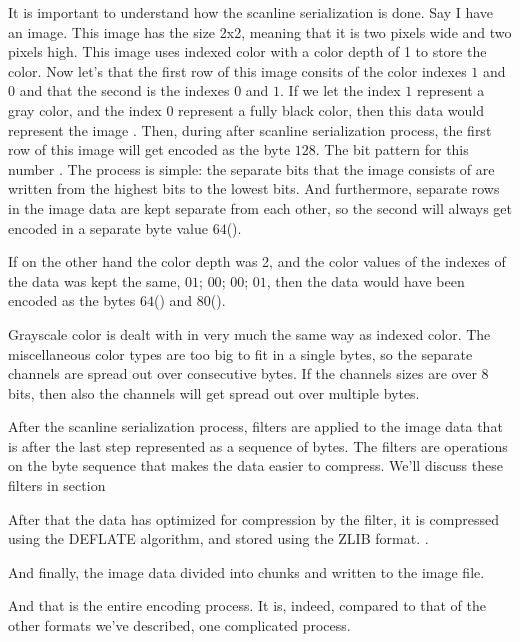 It is important to understand how the scanline serialization is
done. Say I have an image. This image has the size 2x2, meaning that
it is two pixels wide and two pixels high. This image uses indexed
color with a color depth of 1 to store the color. Now let's that the
first row of this image consits of the color indexes $1$ and $0$ and
that the second is the indexes $0$ and $1$. If we let the index $1$
represent a gray color, and the index $0$ represent a fully black
color, then this data would represent the image \checkerimg. Then,
during after scanline serialization process, the first row of this
image will get encoded as the byte $128$. The bit pattern for this
number . The process is simple: the separate bits that
the image consists of are written from the highest bits to the lowest
bits. And furthermore, separate rows in the image data are kept
separate from each other, so the second will always get encoded in a
separate byte value $64$().

If on the other hand the color depth was 2, and the color values of
the indexes of the data was kept the same, $01$; $00$; $00$; $01$,
then the data would have been encoded as the bytes $64$() and $80$().

Grayscale color is dealt with in very much the same way as indexed
color. The miscellaneous color types are too big to fit in a single
bytes, so the separate channels are spread out over consecutive
bytes. If the channels sizes are over 8 bits, then also the channels
will get spread out over multiple bytes.


After the scanline serialization process, filters are applied to the
image data that is after the last step represented as a sequence of
bytes. The filters are operations on the byte sequence that makes the
data easier to compress. We'll discuss these filters in section

After that the data has optimized for compression by the filter, it is
compressed using the DEFLATE algorithm, and stored using the ZLIB
format. \todo{...}.

And finally, the image data divided into \IDAT chunks and written to
the image file.

And that is the entire encoding process. It is, indeed, compared to
that of the other formats we've described, one complicated
process.

